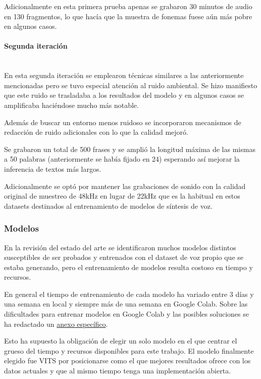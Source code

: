 Adicionalmente en esta primera prueba apenas se grabaron 30 minutos de audio en 130 fragmentos, lo que hacía que la muestra de fonemas fuese aún más pobre en algunos casos.

\paragraph{Segunda iteración} ~\\

En esta segunda iteración se emplearon técnicas similares a las anteriormente mencionadas pero se tuvo especial atención al ruido ambiental. Se hizo manifiesto que este ruido se trasladaba a los resultados del modelo y en algunos casos se amplificaba haciéndose mucho más notable. 

Además de buscar un entorno menos ruidoso se incorporaron mecanismos de redacción de ruido adicionales con lo que la calidad mejoró.

Se grabaron un total de 500 frases y se amplió la longitud máxima de las mismas a 50 palabras (anteriormente se había fijado en 24) esperando así mejorar la inferencia de textos más largos.

Adicionalmente se optó por mantener las grabaciones de sonido con la calidad original de muestreo de 48kHz en lugar de 22kHz que es la habitual en estos datasets destinados al entrenamiento de modelos de síntesis de voz.

\subsubsection{Modelos}

En la revisión del estado del arte se identificaron muchos modelos distintos susceptibles de ser probados y entrenados con el dataset de voz propio que se estaba generando, pero el entrenamiento de modelos resulta costoso en tiempo y recursos.

En general el tiempo de entrenamiento de cada modelo ha variado entre 3 días y una semana en local y siempre más de una semana en Google Colab. Sobre las dificultades para entrenar modelos en Google Colab y las posibles soluciones se ha redactado un \hyperref[Entrenamiento en Google Colab]{anexo específico}.

Esto ha supuesto la obligación de elegir un solo modelo en el que centrar el grueso del tiempo y recursos disponibles para este trabajo. El modelo finalmente elegido fue VITS por posicionarse como el que mejores resultados ofrece con los datos actuales y que al mismo tiempo tenga una implementación abierta.

